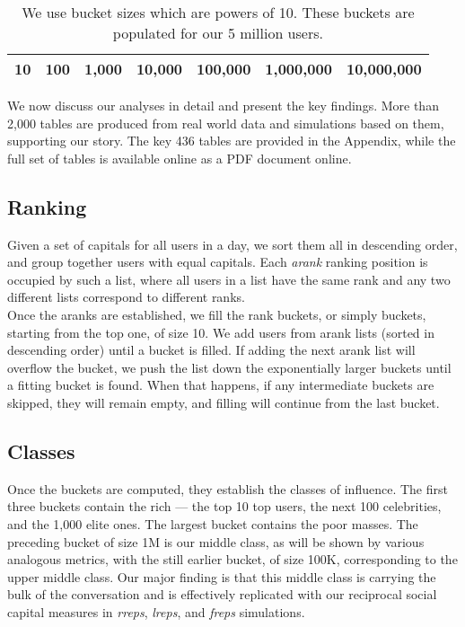 \documentclass[10pt,oneside]{memoir}
\begin{document}
\begin{table}
\begin{tabular}{|ccccccc|}
\toprule
10 & 100 & 1,000 & 10,000 & 100,000 & 1,000,000 & 10,000,000 \\
\bottomrule
\end{tabular}
\label{table:bucket-sizes}
\caption{We use bucket sizes which are powers of 10.  These buckets are populated for our 5 million users.}
\end{table}

We now discuss our analyses in detail and present the key findings.  More than 2,000 tables are produced from real world data and simulations based on them, supporting our story.  The key 436 tables are provided in the Appendix, while the full set of tables is available online as a PDF document online.


\subsection{Ranking}
\label{ranking}

Given a set of capitals for all users in a day, we sort them all in descending order, and group together users with equal capitals.  Each \emph{arank} ranking position is occupied by such a list, where all users in a list have the same rank and any two different lists correspond to different ranks. \\
Once the aranks are established, we fill the rank buckets, or simply buckets, starting from the top one, of size 10.  We add users from arank lists (sorted in descending order) until a bucket is filled.  If adding the next arank list will overflow the bucket, we push the list down the exponentially larger buckets until a fitting bucket is found.  When that happens, if any intermediate buckets are skipped, they will remain empty, and filling will continue from the last bucket.


\subsection{Classes}
\label{classes}

Once the buckets are computed, they establish the classes of influence.  The first three buckets contain the rich --- the top 10 top users, the next 100 celebrities, and the 1,000 elite ones.  The largest bucket contains the poor masses.  The preceding bucket of size 1M is our middle class, as will be shown by various analogous metrics, with the still earlier bucket, of size 100K, corresponding to the upper middle class. Our major finding is that this middle class is carrying the bulk of the conversation and is effectively replicated with our reciprocal social capital measures in \emph{rreps}, \emph{lreps}, and \emph{freps} simulations.
\end{document}
